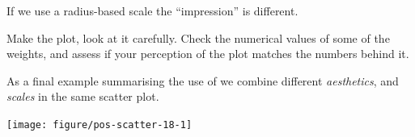 \documentclass[krantz2]{krantz}\usepackage{knitr}%
\begin{document}
\begin{playground}
If we use a radius-based scale the ``impression'' is different.

\begin{knitrout}\footnotesize
{}\color{fgcolor}\begin{kframe}
\begin{alltt}
\hlstd{(}  \hlstd{(}   
                           \hlstd{=} 
                            \hlopt{+}
  \hlstd{()} \hlopt{+}
  \hlstd{()}
\end{alltt}
\end{kframe}
\end{knitrout}

Make the plot, look at it carefully. Check the numerical values of some of the weights, and assess if your perception of the plot matches the numbers behind it.
\end{playground}


As a final example summarising the use of  we combine different \emph{aesthetics}, and \emph{scales} in the same scatter plot.

\begin{knitrout}\footnotesize
{}\color{fgcolor}\begin{kframe}
\begin{alltt}
\hlstd{(}  \hlstd{(}   
                           \hlstd{=} 
                           \hlstd{=} 
                            \hlopt{+}
  \hlstd{(} \hlstd{=} \hlstd{,}  \hlstd{=} \hlstd{)} \hlopt{+}
  \hlstd{()} \hlopt{+}
  \hlstd{(} \hlstd{=} \hlstd{(}\hlstd{,} \hlstd{,} \hlstd{))}
\end{alltt}
\end{kframe}

{\centering \texttt{[image: figure/pos-scatter-18-1]} 

}



\end{knitrout}
\end{document}
